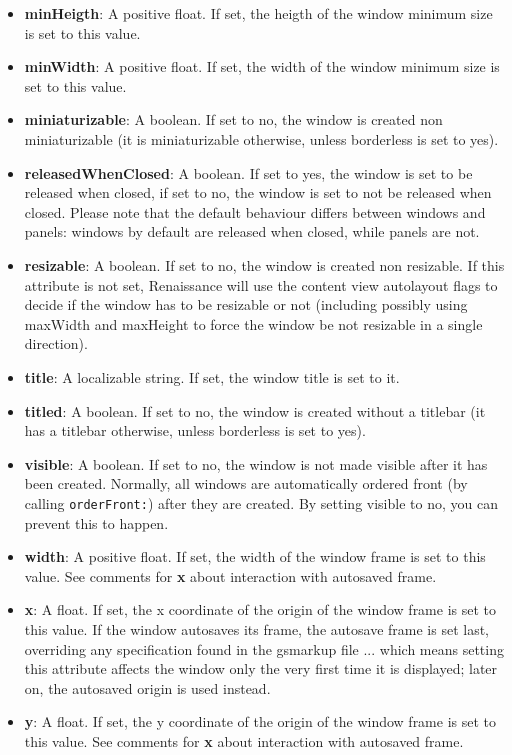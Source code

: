 \begin{itemize}
\item {\bf minHeigth}: A positive float.  If set, the heigth
of the window minimum size is set to this value.
\item {\bf minWidth}: A positive float.  If set, the width  
of the window minimum size is set to this value.
\item {\bf miniaturizable}: A boolean.  If set to no, the window is created 
non miniaturizable (it is miniaturizable otherwise, unless borderless is
set to yes).
\item {\bf releasedWhenClosed}: A boolean.  If set to yes, the window is set 
to be released when closed, if set to no, the window is set to not be
released when closed.  Please note that the default behaviour differs
between windows and panels: windows by default are released when
closed, while panels are not.
\item {\bf resizable}: A boolean.  If set to no, the window is created 
non resizable.  If this attribute is not set, Renaissance will use the
content view autolayout flags to decide if the window has to be
resizable or not (including possibly using maxWidth and maxHeight to
force the window be not resizable in a single direction).
\item {\bf title}: A localizable string.  If set, the window title is set 
to it.
\item {\bf titled}: A boolean.  If set to no, the window is created without
a titlebar (it has a titlebar otherwise, unless borderless is set to yes).
\item {\bf visible}: A boolean.  If set to no, the window is not made visible
after it has been created.  Normally, all windows are automatically
ordered front (by calling \texttt{orderFront:}) after they are
created.  By setting visible to no, you can prevent this to happen.
\item {\bf width}: A positive float.  If set, the width  
of the window frame is set to this value.  See comments for {\bf x} about
interaction with autosaved frame. 
\item {\bf x}: A float.  If set, the x coordinate of the origin 
of the window frame is set to this value.  If the window autosaves its
frame, the autosave frame is set last, overriding any specification
found in the gsmarkup file ... which means setting this attribute affects
the window only the very first time it is displayed; later on, the
autosaved origin is used instead.
\item {\bf y}: A float.  If set, the y coordinate of the origin of 
the window frame is set to this value.  See comments for {\bf x} about
interaction with autosaved frame.
\end{itemize}

